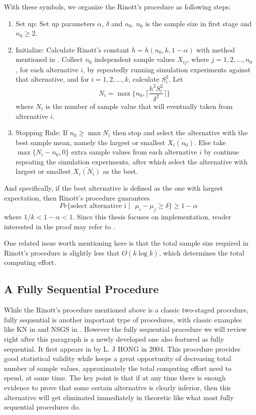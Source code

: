 \documentclass[12pt,a4paper]{report}
\begin{document}
With these symbols, we organize the Rinott's procedure as following steps:

\begin{enumerate}
\item{Set up: } Set up parameters $\alpha$, $\delta$ and $n_0$. $n_0$ is the sample size in first stage and $n_0 \geqslant 2$.
\item{Initialize: } Calculate Rinott's constant $h = h(n_0, k, 1 - \alpha)$ with method mentioned in \cite{rinott-constant}. Collect $n_0$ independent sample values $X_{ij}$, where $j = 1, 2,...,n_0$, for each alternative $i$, by repeatedly running simulation experiments against that alternative, and for $i = 1, 2,...,k$, calculate $S_i^2$. Let 
$$ N_i = \max\{n_0, \lceil \frac{h^2S_i^2}{\delta^2} \rceil\} $$ where $N_i$ is the number of sample value that will eventually taken from alternative $i$.
\item{Stopping Rule: } If $n_0 \geqslant \max N_i$ then stop and select the alternative with the best sample mean, namely the largest or smallest $\bar{X_i(n_0)}$. Else take $\max\{N_i - n_0, 0\}$ extra sample values from each alternative $i$ by continue repeating the simulation experiments, after which select the alternative with largest or smallest $\bar{X_i(N_i)}$ as the best.
\end{enumerate}

And specifically, if the best alternative is defined as the one with largest expectation, then Rinott's procedure guarantees
$$ Pr\{\text{select alternative i }|\text{ }\mu_i - \mu_j \geqslant \delta \} \geqslant 1 - \alpha $$
where $1/k < 1 - \alpha < 1$. Since this thesis focuses on implementation, reader interested in the proof may refer to \cite{ras-recent-advances}. 

One related issue worth mentioning here is that the total sample size required in Rinott's procedure is slightly less that $O(k\log{k})$, which determines the total computing effort.

\subsection{A Fully Sequential Procedure}

While the Rinott's procedure mentioned above is a classic two-staged procedure, fully sequential is another important type of procedures, with classic examples like KN in \cite{tomacs01kn} and NSGS in \cite{or01nsgs}. However the fully sequential procedure we will review right after this paragraph is a newly developed one also featured as fully sequential. It first appears in \cite{ras-seq-jeff} by L. J HONG in 2004. This procedure provides good statistical validity while keeps a great opportunity of decreasing total number of sample values, approximately the total computing effort need to spend, at same time. The key point is that if at any time there is enough evidence to prove that some certain alternative is clearly inferior, then this alternative will get eliminated immediately in theoretic like what most fully sequential procedures do.
\end{document}
